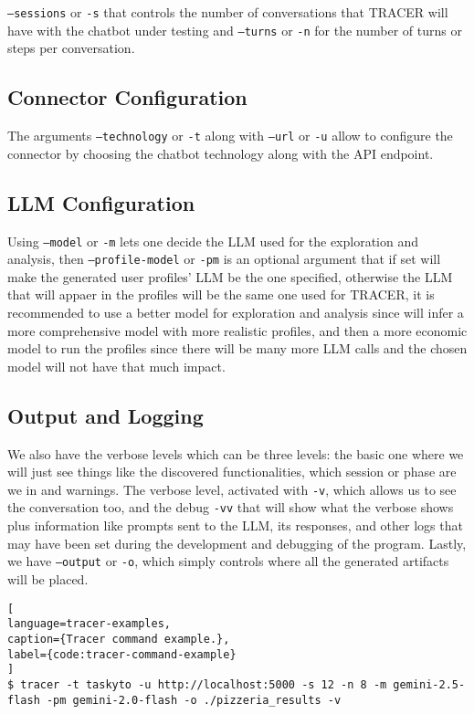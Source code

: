\texttt{--sessions} or \texttt{-s} that controls the number of conversations
that \ac{TRACER} will have with the chatbot under testing
and \texttt{--turns} or \texttt{-n} for the number of turns or steps per conversation.

\subsection{Connector Configuration}

The arguments \texttt{--technology} or \texttt{-t} along with \texttt{--url} or \texttt{-u}
allow to configure the connector by choosing
the chatbot technology along with the \ac{API} endpoint.

\subsection{LLM Configuration}

Using \texttt{--model} or \texttt{-m} lets one decide the \acl{LLM} used for the exploration and analysis,
then \texttt{--profile-model} or \texttt{-pm} is an optional argument
that if set will make the generated user profiles' \ac{LLM} be the one specified,
otherwise the \ac{LLM} that will appaer in the profiles will be the same one used for \ac{TRACER},
it is recommended to use a better model for exploration and analysis
since will infer a more comprehensive model with more realistic profiles,
and then a more economic model to run the profiles
since there will be many more \ac{LLM} calls
and the chosen model will not have that much impact.

\subsection{Output and Logging}

We also have the verbose levels which can be three levels:
the basic one where we will just see things like the discovered functionalities,
which session or phase are we in and warnings.
The verbose level, activated with \texttt{-v},
which allows us to see the conversation too,
and the debug \texttt{-vv} that will show what the verbose shows plus information like
prompts sent to the \ac{LLM}, its responses,
and other logs that may have been set during the development and debugging of the program.
Lastly, we have \texttt{--output} or \texttt{-o},
which simply controls where all the generated artifacts will be placed.

\begin{lstlisting}[
language=tracer-examples,
caption={Tracer command example.},
label={code:tracer-command-example}
]
$ tracer -t taskyto -u http://localhost:5000 -s 12 -n 8 -m gemini-2.5-flash -pm gemini-2.0-flash -o ./pizzeria_results -v
\end{lstlisting}


